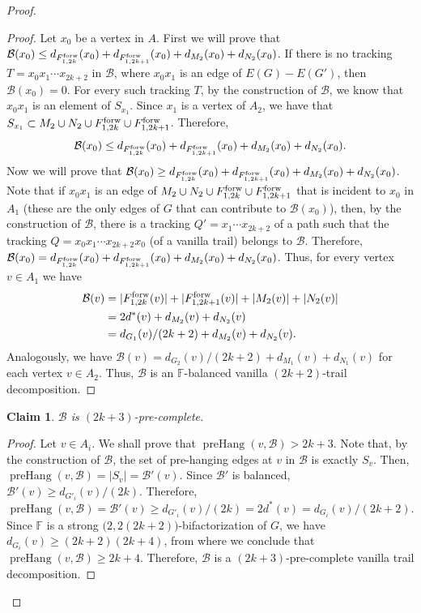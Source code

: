 \documentclass[12pt,reqno,a4paper]{amsart}
\newtheorem{claim}[theorem]{Claim}
\DeclareMathOperator{\prehang}{preHang}
\def\forw{\mathop{\text{\rm forw}}\nolimits}
\newcommand{\B}{\mathcal{B}}
\begin{document}
\begin{proof}
\begin{proof}
Let \(x_0\) be a vertex in \(A\). First we will prove that \(\B(x_0) \leq 
d_{F_{1,2k}^{\forw}}(x_0) + d_{F_{1,2k+1}^{\forw}}(x_0) 
+ d_{M_2}(x_0) + d_{N_2}(x_0)\).
If there is no tracking \(T = x_0x_1\cdots x_{2k+2}\) in $\B$, where $x_0x_1$ is an 
edge of \(E(G)-E(G')\), then $\B(x_0)=0$. 
For every such tracking $T$, by the 
construction of $\B$, we know that $x_0x_1$ is an element of $S_{x_1}$.
Since \(x_1\) is a vertex of \(A_2\), we have 
that \(S_{x_1} \subset M_2\cup N_2 \cup F_{1,2k}^{\forw} \cup 
F_{1,2k+1}^{\forw}\).
Therefore,
\begin{equation*}
\B(x_0) \leq d_{F_{1,2k}^{\forw}}(x_0) + d_{F_{1,2k+1}^{\forw}}(x_0) 
+ d_{M_2}(x_0) + d_{N_2}(x_0).
\end{equation*}
Now we will prove that $\B(x_0)\geq d_{F_{1,2k}^{\forw}}(x_0) + 
d_{F_{1,2k+1}^{\forw}}(x_0) + d_{M_2}(x_0) + d_{N_2}(x_0)$.
Note that if \(x_0x_1\) is an edge of 
\(M_2\cup N_2 \cup F_{1,2k}^{\forw} \cup F_{1,2k+1}^{\forw}\)
that is incident to \(x_0\) in $A_1$ \big(these are the only edges of $G$ that 
can contribute to $\B(x_0)$\big), then, by the construction of $\B$, there is a 
tracking \(Q' = x_1\cdots x_{2k+2}\) of a path such that the tracking  \(Q = x_0x_1\cdots 
x_{2k+2}\)\(x_0\) (of a vanilla trail) belongs to $\B$.
Therefore, \(\B(x_0) = d_{F_{1,2k}^{\forw}}(x_0) + d_{F_{1,2k+1}^{\forw}}(x_0) 
				+ d_{M_2}(x_0) + d_{N_2}(x_0)\).
Thus, for every vertex \(v\in A_1\) we have 
\begin{align*}
	\B(v)	&= |F_{1,2k}^{\forw}(v)| + |F_{1,2k+1}^{\forw}(v)| + |M_2(v)| + 
|N_2(v)| \\
			&= 2d^*(v) + d_{M_2}(v) + d_{N_2}(v) \\
			&= d_{G_1}(v)/(2k+2) + d_{M_2}(v) + d_{N_2}(v).
\end{align*}
Analogously, we have \(\B(v) = d_{G_2}(v)/(2k+2) + d_{M_1}(v) + d_{N_1}(v)\)
for each vertex \(v\in A_2\).
Thus, \(\B\) is an \(\mathbb{F}\)-balanced vanilla $(2k+2)$-trail decomposition.
\end{proof}

\begin{claim}
\(\B\) is \((2k+3)\)-pre-complete.
\end{claim}

\begin{proof}
Let  \(v\in A_i\).
We shall prove that \(\prehang(v,\B) > 2k+3\).
Note that, by the construction of $\B$, the set of pre-hanging edges at \(v\) 
in \(\B\)
is exactly \(S_v\).
Then, \(\prehang(v,\B) = |S_v| = \B'(v)\).
Since \(\B'\) is balanced, \(\B'(v) \geq d_{G'_i}(v)/(2k)\).
Therefore,
\begin{equation*}
	\prehang(v,\B)	= \B'(v) 
					\geq d_{G'_i}(v)/(2k) 
					= 2d^*(v) 
					= d_{G_i}(v)/(2k+2).
\end{equation*} 
Since \(\mathbb{F}\) is a strong \(\big(2,2(2k+2)\big)\)-bifactorization of \(G\),
we have \(d_{G_i}(v) \geq (2k+2)(2k+4)\), from where we conclude that  
\(\prehang(v,\B) \geq 2k+4\).
Therefore, \(\B\) is a \((2k+3)\)-pre-complete vanilla trail decomposition.
\end{proof}


\end{proof}
\end{document}
